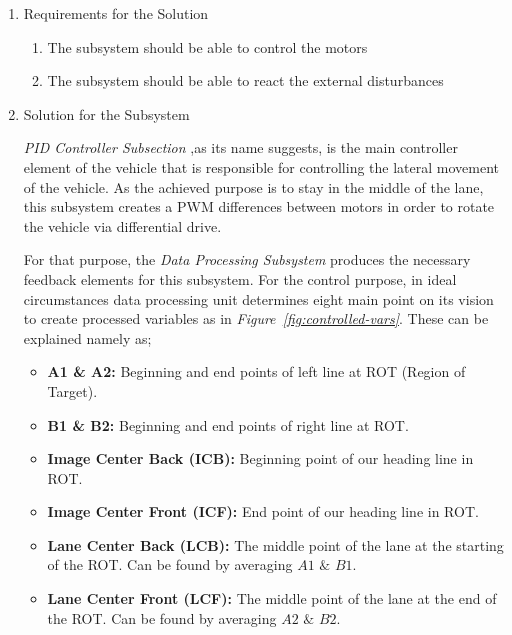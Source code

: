 \documentclass[a4paper,12pt]{article}
\begin{document}
\begin{enumerate}

\item {Requirements for the Solution}


\begin{enumerate}

\item The subsystem should be able to control the motors

\item The subsystem should be able to react the external disturbances

\end{enumerate} 


\item {Solution for the Subsystem}


\textit{PID Controller Subsection} ,as its name suggests, is the main controller element of the vehicle that is responsible for controlling the lateral movement of the vehicle. As the achieved purpose is to stay in the middle of the lane, this subsystem creates a PWM differences between motors in order to rotate the vehicle via differential drive. 


For that purpose, the \textit{Data Processing Subsystem} produces the necessary feedback elements for this subsystem. For the control purpose, in ideal circumstances data processing unit determines eight main point on its vision to create processed variables as in \textit{Figure~\ref{fig:controlled-vars}}. These can be explained namely as;

\begin{itemize}

\item \textbf{A1 \& A2:} Beginning and end points of left line at ROT (Region of Target).

\item \textbf{B1 \& B2:} Beginning and end points of right line at ROT.	

\item \textbf{Image Center Back (ICB):} Beginning point of our heading line in ROT.

\item \textbf{Image Center Front (ICF):} End point of our heading line in ROT.  

\item \textbf{Lane Center Back (LCB):} The middle point of the lane at the starting of the ROT. Can be found by averaging $A1$ $\&$ $B1$.

\item \textbf{Lane Center Front (LCF):} The middle point of the lane at the end of the ROT. Can be found by averaging $A2$ $\&$ $B2$.


\end{itemize}
\end{enumerate}
\end{document}
